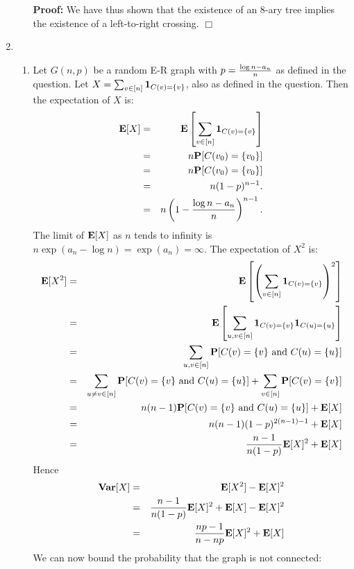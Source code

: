\documentclass[11pt]{article} \usepackage{amssymb}
\newenvironment{proof}{\noindent \textbf{Proof:}}{$\Box$}
\newcommand{\E}{{\bf E}} \newcommand{\Cov}{{\bf Cov}}
\newcommand{\Var}{{\bf Var}} \newcommand{\Varx}{\mathop{\bf Var\/}}
\begin{document}
\begin{enumerate}
\begin{enumerate}
\begin{proof}
        We have thus shown that the existence of an 8-ary tree implies the
        existence of a left-to-right crossing.
      \end{proof}
    \end{enumerate}
  \item
    \begin{enumerate}
    \item 
      Let $G(n,p)$ be a random E-R graph with $p={\log n-a_n\over n}$ as defined
      in the question. Let $X=\sum_{v\in[n]}{\bf 1}_{C(v)=\{v\}}$, also as defined
      in the question. Then the expectation of $X$ is:
      \begin{eqnarray*}
        \E[X] &=& \E\left[\sum_{v\in[n]}{\bf 1}_{C(v)=\{v\}}\right]
        \\ &=& n\P[C(v_0)=\{v_0\}]
        \\ &=& n\P[C(v_0)=\{v_0\}]
        \\ &=& n(1-p)^{n-1}.
        \\ &=& n\left(1-{\log n-a_n\over n}\right)^{n-1}.
      \end{eqnarray*}
      The limit of $\E[X]$ as $n$ tends to infinity is 
      $n\exp(a_n-\log n)=\exp(a_n)=\infty$.
      The expectation of $X^2$ is:
      \begin{eqnarray*}
        \E[X^2] &=& \E\left[\left(\sum_{v\in[n]}{\bf 1}_{C(v)=\{v\}}\right)^2\right]
        \\ &=& \E\left[\sum_{u,v\in[n]}{\bf 1}_{C(v)=\{v\}}{\bf 1}_{C(u)=\{u\}}\right]
        \\ &=& \sum_{u,v\in[n]}\P[C(v)=\{v\} \mbox{ and } C(u)=\{u\}]
        \\ &=& \sum_{u\neq v\in[n]}\P[C(v)=\{v\} \mbox{ and } C(u)=\{u\}]+\sum_{v\in[n]}\P[C(v)=\{v\}]
        \\ &=& n(n-1)\P[C(v)=\{v\} \mbox{ and } C(u)=\{u\}]+\E[X]
        \\ &=& n(n-1)(1-p)^{2(n-1)-1}+\E[X]
        \\ &=& {n-1\over n(1-p)}\E[X]^2+\E[X]
      \end{eqnarray*}
      Hence
      \begin{eqnarray*}
        \Var[X]&=&\E[X^2]-\E[X]^2
        \\ &=& {n-1\over n(1-p)}\E[X]^2+\E[X] - \E[X]^2
        \\ &=& {np-1\over n-np}\E[X]^2+\E[X] 
      \end{eqnarray*}
      We can now bound the probability that the graph is not connected:
      \begin{eqnarray*}

\end{eqnarray*}
\end{enumerate}
\end{enumerate}
\end{document}

